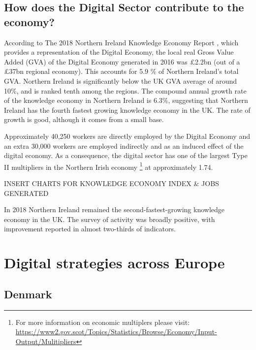 \subsection{How does the Digital Sector contribute to the economy?}

According to The 2018 Northern Ireland Knowledge Economy Report \citep{KnowledgeEconomy2019}, which provides a representation of the Digital Economy, the local real Gross Value Added (GVA) of the Digital Economy generated in 2016 was \pounds 2.2bn (out of a \pounds 37bn regional economy). This accounts for 5.9 \% of Northern Ireland's total GVA. Northern Ireland is significantly below the UK GVA average of around 10\%, and is ranked tenth among the regions. The compound annual growth rate of the knowledge economy in Northern Ireland is 6.3\%, suggesting that Northern Ireland has the fourth fastest growing knowledge economy in the UK. The rate of growth is good, although it comes from a small base.

Approximately 40,250 workers are directly employed by the Digital Economy and an extra 30,000 workers are employed indirectly and as an induced effect of the digital economy. As a consequence, the digital sector has one of the largest Type II multipliers in the Northern Irish economy \footnote[1]{For more information on economic multiplers please visit:\\ \href{https://www2.gov.scot/Topics/Statistics/Browse/Economy/Input-Output/Mulitipliers}{https://www2.gov.scot/Topics/Statistics/Browse/Economy/Input-Output/Mulitipliers}} at approximately 1.74.

\begin{center}
    INSERT CHARTS FOR KNOWLEDGE ECONOMY INDEX \& JOBS GENERATED
\end{center}

In 2018 Northern Ireland remained the second-fastest-growing knowledge economy in the UK. The survey of activity was broadly positive, with improvement reported in almost two-thirds of indicators.  



\section{Digital strategies across Europe}

\subsection{Denmark}


